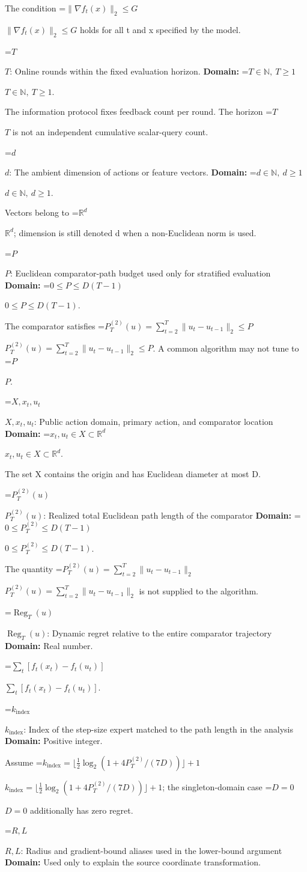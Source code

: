 \documentclass[10pt,a4paper]{article}
\newcommand{\AtlasMath}[1]{\par\begingroup\centering\setbox0=\hbox{$\displaystyle #1$}\ifdim\wd0>1.4\linewidth\typeout{ATLAS WIDE FORMULA: \the\wd0}\fi\ifdim\wd0>\linewidth\resizebox{\linewidth}{!}{\box0}\else\box0\fi\par\endgroup}
\newcommand{\AtlasInlineMath}[1]{\begingroup\setbox0=\hbox{$#1$}\ifdim\wd0>.4\linewidth\endgroup\AtlasMath{#1}\else\endgroup$#1$\fi}
\begin{document}
The condition \AtlasInlineMath{\|\nabla f_t(x)\|_2\le G} holds for all t and x specified by the model.

\AtlasInlineMath{T}: Online rounds within the fixed evaluation horizon. \textbf{Domain:} \AtlasInlineMath{T\in\mathbb N,\ T\ge1}.

The information protocol fixes feedback count per round. The horizon \AtlasInlineMath{T} is not an independent cumulative scalar-query count.

\AtlasInlineMath{d}: The ambient dimension of actions or feature vectors. \textbf{Domain:} \AtlasInlineMath{d\in\mathbb N,\ d\ge1}.

Vectors belong to \AtlasInlineMath{\mathbb R^d}; dimension is still denoted d when a non-Euclidean norm is used.

\AtlasInlineMath{P}: Euclidean comparator-path budget used only for stratified evaluation \textbf{Domain:} \AtlasInlineMath{0\le P\le D(T-1)}.

The comparator satisfies \AtlasInlineMath{P_T^{(2)}(u)=\sum_{t=2}^T\|u_t-u_{t-1}\|_2\le P}. A common algorithm may not tune to \AtlasInlineMath{P}.

\AtlasInlineMath{X,x_t,u_t}: Public action domain, primary action, and comparator location \textbf{Domain:} \AtlasInlineMath{x_t,u_t\in X\subset\mathbb R^d}.

The set X contains the origin and has Euclidean diameter at most D.

\AtlasInlineMath{P_T^{(2)}(u)}: Realized total Euclidean path length of the comparator \textbf{Domain:} \AtlasInlineMath{0\le P_T^{(2)}\le D(T-1)}.

The quantity \AtlasInlineMath{P_T^{(2)}(u)=\sum_{t=2}^T\|u_t-u_{t-1}\|_2} is not supplied to the algorithm.

\AtlasInlineMath{\operatorname{Reg}_T(u)}: Dynamic regret relative to the entire comparator trajectory \textbf{Domain:} Real number.

\AtlasInlineMath{\sum_t[f_t(x_t)-f_t(u_t)]}.

\AtlasInlineMath{k_{\mathrm{index}}}: Index of the step-size expert matched to the path length in the analysis \textbf{Domain:} Positive integer.

Assume \AtlasInlineMath{k_{\mathrm{index}}=\lfloor\frac12\log_2(1+4P_T^{(2)}/(7D))\rfloor+1}; the singleton-domain case \AtlasInlineMath{D=0} additionally has zero regret.

\AtlasInlineMath{R,L}: Radius and gradient-bound aliases used in the lower-bound argument \textbf{Domain:} Used only to explain the source coordinate transformation.
\end{document}

